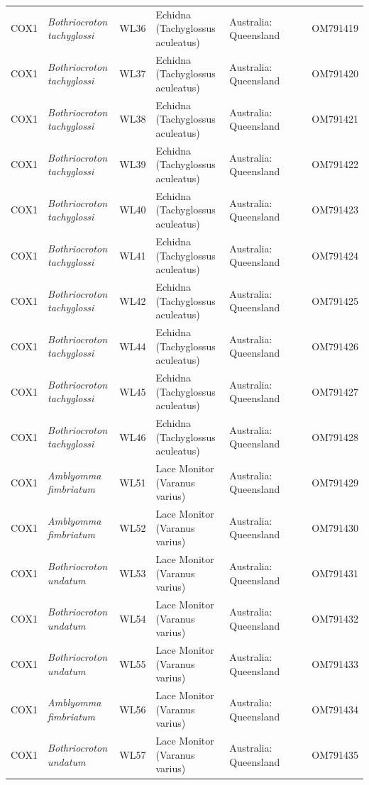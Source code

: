 \documentclass[a4paper, nobind]{templates/ociamthesis}
\begin{document}
\begin{landscape}
\begin{longtable}[t]{l>{}lllllll}
COX1 & \em{Bothriocroton tachyglossi} & WL36 & Echidna (Tachyglossus aculeatus) & Australia: Queensland &  &  & OM791419\\
COX1 & \em{Bothriocroton tachyglossi} & WL37 & Echidna (Tachyglossus aculeatus) & Australia: Queensland &  &  & OM791420\\
COX1 & \em{Bothriocroton tachyglossi} & WL38 & Echidna (Tachyglossus aculeatus) & Australia: Queensland &  &  & OM791421\\
COX1 & \em{Bothriocroton tachyglossi} & WL39 & Echidna (Tachyglossus aculeatus) & Australia: Queensland &  &  & OM791422\\
COX1 & \em{Bothriocroton tachyglossi} & WL40 & Echidna (Tachyglossus aculeatus) & Australia: Queensland &  &  & OM791423\\
COX1 & \em{Bothriocroton tachyglossi} & WL41 & Echidna (Tachyglossus aculeatus) & Australia: Queensland &  &  & OM791424\\
COX1 & \em{Bothriocroton tachyglossi} & WL42 & Echidna (Tachyglossus aculeatus) & Australia: Queensland &  &  & OM791425\\
COX1 & \em{Bothriocroton tachyglossi} & WL44 & Echidna (Tachyglossus aculeatus) & Australia: Queensland &  &  & OM791426\\
COX1 & \em{Bothriocroton tachyglossi} & WL45 & Echidna (Tachyglossus aculeatus) & Australia: Queensland &  &  & OM791427\\
COX1 & \em{Bothriocroton tachyglossi} & WL46 & Echidna (Tachyglossus aculeatus) & Australia: Queensland &  &  & OM791428\\
COX1 & \em{Amblyomma fimbriatum} & WL51 & Lace Monitor (Varanus varius) & Australia: Queensland &  &  & OM791429\\
COX1 & \em{Amblyomma fimbriatum} & WL52 & Lace Monitor (Varanus varius) & Australia: Queensland &  &  & OM791430\\
COX1 & \em{Bothriocroton undatum} & WL53 & Lace Monitor (Varanus varius) & Australia: Queensland &  &  & OM791431\\
COX1 & \em{Bothriocroton undatum} & WL54 & Lace Monitor (Varanus varius) & Australia: Queensland &  &  & OM791432\\
COX1 & \em{Bothriocroton undatum} & WL55 & Lace Monitor (Varanus varius) & Australia: Queensland &  &  & OM791433\\
COX1 & \em{Amblyomma fimbriatum} & WL56 & Lace Monitor (Varanus varius) & Australia: Queensland &  &  & OM791434\\
COX1 & \em{Bothriocroton undatum} & WL57 & Lace Monitor (Varanus varius) & Australia: Queensland &  &  & OM791435\\

\end{longtable}
\end{landscape}
\end{document}
